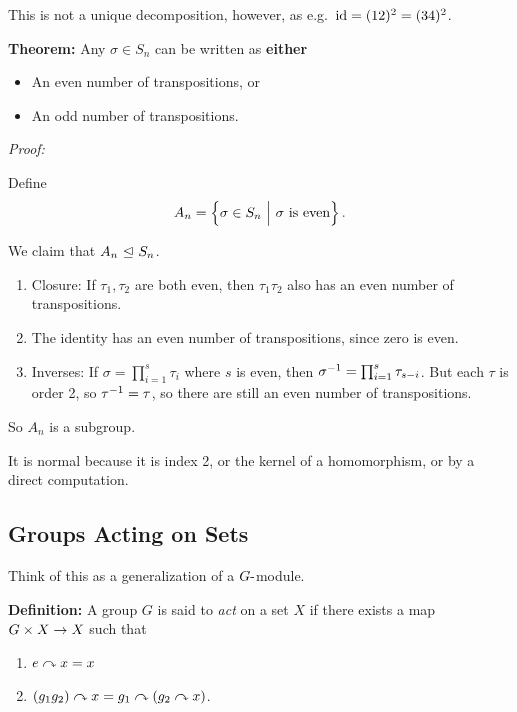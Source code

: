 This is not a unique decomposition, however, as
e.g.~\(\text{id} = (1 2)^{2} = (3 4)^{2}\).

\textbf{Theorem:} Any \(\sigma \in S_{n}\) can be written as
\textbf{either}

\begin{itemize}
\item
  An even number of transpositions, or
\item
  An odd number of transpositions.
\end{itemize}

\emph{Proof:}

Define \[
A_{n} = \left\{{\sigma \in S_{n} {~\mathrel{\Big|}~} \sigma\text{ is even}}\right\}
.\]

We claim that \(A_{n} {~\trianglelefteq~} S_{n}\).

\begin{enumerate}
\def\labelenumi{\arabic{enumi}.}
\item
  Closure: If \(\tau_{1}, \tau_{2}\) are both even, then
  \(\tau_{1}\tau_{2}\) also has an even number of transpositions.
\item
  The identity has an even number of transpositions, since zero is even.
\item
  Inverses: If \(\sigma = \prod_{i=1}^{s} \tau_{i}\) where \(s\) is
  even, then \(\sigma^{-1} = \prod_{i=1}^{s} \tau_{s-i}\). But each
  \(\tau\) is order 2, so \(\tau^{-1} = \tau\), so there are still an
  even number of transpositions.
\end{enumerate}

So \(A_{n}\) is a subgroup.

It is normal because it is index 2, or the kernel of a homomorphism, or
by a direct computation.

\hypertarget{groups-acting-on-sets}{%
\subsection{Groups Acting on Sets}\label{groups-acting-on-sets}}

Think of this as a generalization of a \(G{\hbox{-}}\)module.

\textbf{Definition:} A group \(G\) is said to \emph{act} on a set \(X\)
if there exists a map \(G\times X \to X\) such that

\begin{enumerate}
\def\labelenumi{\arabic{enumi}.}
\item
  \(e\curvearrowright x = x\)
\item
  \((g_{1} g_{2})\curvearrowright x = g_{1} \curvearrowright (g_{2} \curvearrowright x)\).
\end{enumerate}

